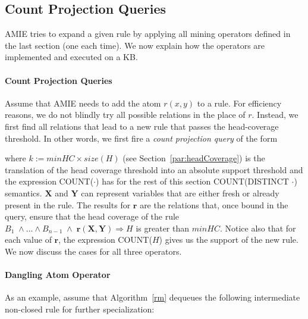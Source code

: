 \subsection{Count Projection Queries}
\label{subsec:countqueries}

AMIE tries to expand a given rule by applying all mining operators defined in the last section (one each time). 
We now explain how the operators are implemented and executed on a KB.

\paragraph{Count Projection Queries} 
Assume that AMIE needs to add the atom $r(x,y)$ to a rule. 
For efficiency reasons, we do not blindly try all possible relations in the place of $r$. Instead, we first 
find all relations that lead to a new rule that passes the head-coverage threshold.
In other words, we first fire a \emph{count projection query} of the form


\noindent where $k := minHC \times size(H)$ (see Section~\ref{par:headCoverage}) is the translation of the
head coverage threshold into an absolute support threshold and the expression COUNT($\cdot$) has for the rest of this section COUNT(DISTINCT $\cdot$) semantics.
$\bm{X}$ and $\bm{Y}$ can represent variables that are either fresh or already present in the rule.
The results for $\bm{r}$ are the relations that, once bound in the query, ensure that the head coverage of the rule $B_1 \; \wedge ... \wedge B_{n-1} \;\wedge\; \bm{r}(\bm{X},\bm{Y}) \Rightarrow H$ is greater than $minHC$.
Notice also that for each value of $\bm{r}$, the expression COUNT($H$) gives us the support of the new rule.
We now discuss the cases for all three operators.

\paragraph{Dangling Atom Operator} 
As an example, assume that Algorithm~\ref{rm} dequeues the following intermediate non-closed rule for further specialization:

